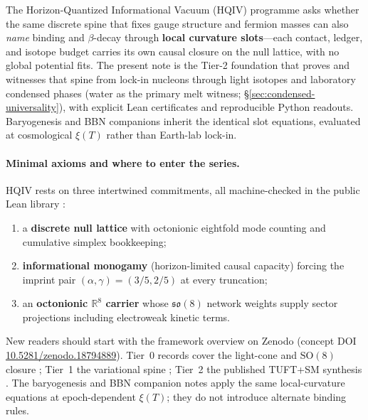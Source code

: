 \documentclass[11pt,notitlepage]{amsart}
\begin{document}
The Horizon-Quantized Informational Vacuum (HQIV) programme asks whether the same
discrete spine that fixes gauge structure and fermion masses can also \emph{name}
binding and $\beta$-decay through \textbf{local curvature slots}---each contact,
ledger, and isotope budget carries its own causal closure on the null lattice, with
no global potential fits. The present note is the Tier-2 foundation that proves and
witnesses that spine from lock-in nucleons through light isotopes and laboratory
condensed phases (water as the primary melt witness; \S\ref{sec:condensed-universality}),
with explicit Lean certificates and reproducible Python readouts. Baryogenesis and BBN
companions inherit the identical slot equations, evaluated at
cosmological $\xi(T)$ rather than Earth-lab lock-in.

\paragraph{Minimal axioms and where to enter the series.}
HQIV rests on three intertwined commitments, all machine-checked in the public Lean
library \cite{hqiv-lean}:
\begin{enumerate}[leftmargin=2em]
\item a \textbf{discrete null lattice} with octonionic eightfold mode counting and
  cumulative simplex bookkeeping;
\item \textbf{informational monogamy} (horizon-limited causal capacity) forcing the
  imprint pair $(\alpha,\gamma)=(3/5,2/5)$ at every truncation;
\item an \textbf{octonionic $\mathbb{R}^8$ carrier} whose $\mathfrak{so}(8)$ network
  weights supply sector projections including electroweak kinetic terms.
\end{enumerate}
New readers should start with the framework overview on Zenodo
\cite{ettinger2026hqiv} (concept DOI \href{https://doi.org/10.5281/zenodo.18794889}{10.5281/zenodo.18794889}).
Tier~0 records cover the light-cone and $\mathrm{SO}(8)$ closure
\cite{hqiv-lightcone-paper,hqiv-so8-paper}; Tier~1 the variational spine
\cite{hqiv-3d-growth-paper,hqiv-oct-action-paper,hqiv-kirchhoff-paper,hqiv-thermo-arrow-paper};
Tier~2 the published TUFT+SM synthesis \cite{hqiv-tuft-sm-lagrangian-paper}.
The baryogenesis and BBN companion notes apply the same local-curvature equations at
epoch-dependent $\xi(T)$; they do not introduce alternate binding rules.
\end{document}
